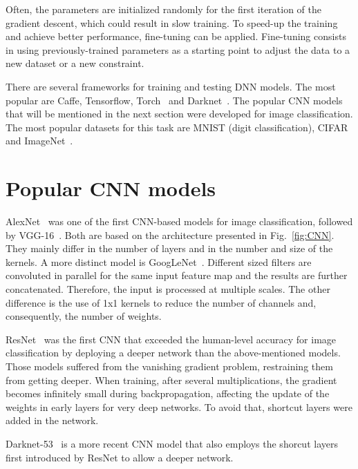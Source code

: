 Often, the parameters are initialized randomly for the first iteration of the gradient descent, which could result in slow training. To speed-up the training and achieve better performance, fine-tuning can be applied. Fine-tuning consists in using previously-trained parameters as a starting point to adjust the data to a new dataset or a new constraint.

There are several frameworks for training and testing DNN models. The most popular are Caffe, Tensorflow, Torch~\cite{sze:dnn_survey} and Darknet~\cite{Redmon2015YouOL}. The popular CNN models that will be mentioned in the next section were developed for image classification. The most popular datasets for this task are MNIST (digit classification), CIFAR and ImageNet~\cite{sze:dnn_survey}.


\section{Popular CNN models}
\label{section:popular_models}

AlexNet~\cite{sze:dnn_survey} was one of the first CNN-based models for image classification, followed by VGG-16~\cite{sze:dnn_survey}. Both are based on the architecture presented in Fig.~\ref{fig:CNN}. They mainly differ in the number of layers and in the number and size of the kernels. A more distinct model is GoogLeNet~\cite{sze:dnn_survey}. Different sized filters are convoluted in parallel for the same input feature map and the results are further concatenated. Therefore, the input is processed at multiple scales. The other difference is the use of 1x1 kernels to reduce the number of channels and, consequently, the number of weights. 

ResNet~\cite{sze:dnn_survey} was the first CNN that exceeded the human-level accuracy for image classification by deploying a deeper network than the above-mentioned models. Those models suffered from the vanishing gradient problem, restraining them from getting deeper. When training, after several multiplications, the gradient becomes infinitely small during backpropagation, affecting the update of the weights in early layers for very deep networks. To avoid that, shortcut layers were added in the network.

Darknet-53~\cite{Redmon2018YOLOv3AI} is a more recent CNN model that also employs the shorcut layers first introduced by ResNet to allow a deeper network.  

